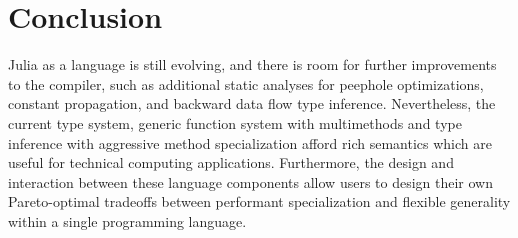 \documentclass[10pt, preprint]{sigplanconf}
\begin{document}





\section{Conclusion}

Julia as a language is still evolving, and there is room for further
improvements to the compiler, such as additional static analyses for peephole
optimizations, constant propagation, and backward data flow type inference.
Nevertheless, the current type system, generic function system with
multimethods and type inference with aggressive method specialization afford
rich semantics which are useful for technical computing applications.
Furthermore, the design and interaction between these language components allow
users to design their own Pareto-optimal tradeoffs between performant
specialization and flexible generality within a single programming language.
\end{document}
